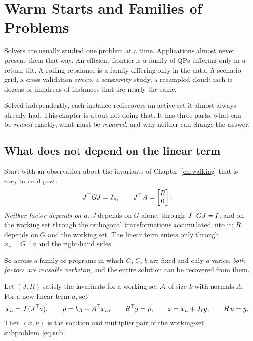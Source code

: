 \chapter{Warm Starts and Families of Problems}
\label{ch:warmstart}

Solvers are usually studied one problem at a time. Applications almost never present
them that way. An efficient frontier is a family of QPs differing only in a return
tilt. A rolling rebalance is a family differing only in the data. A scenario grid, a
cross-validation sweep, a sensitivity study, a resampled cloud: each is dozens or
hundreds of instances that are nearly the same.

Solved independently, each instance rediscovers an active set it almost always
already had. This chapter is about not doing that. It has three parts: what can be
\emph{reused} exactly, what must be \emph{repaired}, and why neither can change the
answer.

\section{What does not depend on the linear term}

Start with an observation about the invariants of Chapter~\ref{ch:walking} that is
easy to read past.
\begin{equation*}
  J^{\top} G J = I_n, \qquad J^{\top} A = \begin{bmatrix} R \\ 0 \end{bmatrix}.
\end{equation*}
\emph{Neither factor depends on $a$.} $J$ depends on $G$ alone, through
$J^{\top} GJ = I$, and on the working set through the orthogonal transformations
accumulated into it; $R$ depends on $G$ and the working set. The linear term enters
only through $x_u = G^{-1}a$ and the right-hand sides.

So across a family of programs in which $G$, $C$, $b$ are fixed and only $a$ varies,
\emph{both factors are reusable verbatim}, and the entire solution can be recovered
from them.

\begin{proposition}
\label{prop:recover}
Let $(J,R)$ satisfy the invariants for a working set $\mathcal{A}$ of size $k$ with
normals $A$. For a new linear term $a$, set
\begin{equation}
  x_u = J\,(J^{\top} a),
  \qquad
  \rho = b_{\mathcal{A}} - A^{\top} x_u,
  \qquad
  R^{\top} y = \rho,
  \qquad
  x = x_u + J_1 y,
  \qquad
  R\,u = y .
  \label{eq:recover}
\end{equation}
Then $(x,u)$ is the solution and multiplier pair of the working-set
subproblem~\eqref{eq:sub}.
\end{proposition}


